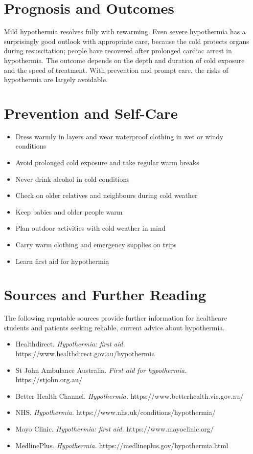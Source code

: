 \section*{Prognosis and Outcomes}
Mild hypothermia resolves fully with rewarming. Even severe hypothermia has a surprisingly good outlook with appropriate care, because the cold protects organs during resuscitation; people have recovered after prolonged cardiac arrest in hypothermia. The outcome depends on the depth and duration of cold exposure and the speed of treatment. With prevention and prompt care, the risks of hypothermia are largely avoidable.

\section*{Prevention and Self-Care}
\begin{itemize}
    \item Dress warmly in layers and wear waterproof clothing in wet or windy conditions
    \item Avoid prolonged cold exposure and take regular warm breaks
    \item Never drink alcohol in cold conditions
    \item Check on older relatives and neighbours during cold weather
    \item Keep babies and older people warm
    \item Plan outdoor activities with cold weather in mind
    \item Carry warm clothing and emergency supplies on trips
    \item Learn first aid for hypothermia
\end{itemize}

\section*{Sources and Further Reading}
The following reputable sources provide further information for healthcare students and patients seeking reliable, current advice about hypothermia.

\begin{itemize}
    \item Healthdirect. \textit{Hypothermia: first aid.} https://www.healthdirect.gov.au/hypothermia
    \item St John Ambulance Australia. \textit{First aid for hypothermia.} https://stjohn.org.au/
    \item Better Health Channel. \textit{Hypothermia.} https://www.betterhealth.vic.gov.au/
    \item NHS. \textit{Hypothermia.} https://www.nhs.uk/conditions/hypothermia/
    \item Mayo Clinic. \textit{Hypothermia: first aid.} https://www.mayoclinic.org/
    \item MedlinePlus. \textit{Hypothermia.} https://medlineplus.gov/hypothermia.html
\end{itemize}
